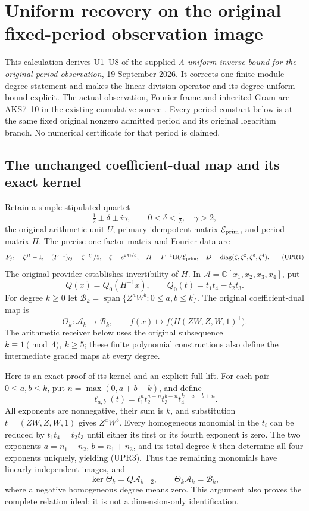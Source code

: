 \begingroup
\section{Uniform recovery on the original fixed-period observation image}
\label{sec:UPR}

This calculation derives U1--U8 of the supplied
\emph{A uniform inverse bound for the original period observation},
19 September 2026.  It corrects one finite-module degree statement and
makes the linear division operator and its degree-uniform bound explicit.
The actual observation, Fourier frame and inherited Gram are AKS7--10
in the existing cumulative source \cite{programme:aks-current}.
Every period constant below is at the same fixed original nonzero
admitted period and its original logarithm branch.  No numerical
certificate for that period is claimed.

\subsection{The unchanged coefficient-dual map and its exact kernel}
Retain a simple stipulated quartet
\[
\tfrac12\pm\delta\pm i\gamma,\qquad
0<\delta<\tfrac12,\quad\gamma>2,
\]
the original arithmetic unit \(U\), primary idempotent matrix
\(\mathcal E_{\rm prim}\), and period matrix \(\Pi\).  The precise
one-factor matrix and Fourier data are
\[
F_{jt}=\zeta^{jt}-1,\quad
(F^{-1})_{tj}=\zeta^{-tj}/5,\quad
\zeta=e^{2\pi i/5},\quad
H=F^{-1}\Pi U\mathcal E_{\rm prim},\quad
D=\operatorname{diag}(\zeta,\zeta^2,\zeta^3,\zeta^4).
\tag{UPR1}
\]
The original provider establishes invertibility of \(H\).  In
\(\mathcal A=\mathbb C[x_1,x_2,x_3,x_4]\), put
\[
Q(x)=Q_0(H^{-1}x),\qquad Q_0(t)=t_1t_4-t_2t_3.
\]
For degree \(k\ge0\) let
\(\mathcal B_k=\operatorname{span}\{Z^aW^b:0\le a,b\le k\}\).
The original coefficient-dual map is
\[
\Theta_k:\mathcal A_k\longrightarrow\mathcal B_k,\qquad
f(x)\longmapsto f\bigl(H(ZW,Z,W,1)^{\mathsf T}\bigr).
\tag{UPR2}
\]
The arithmetic receiver below uses the original subsequence
\(k\equiv1\pmod4,\ k\ge5\); these finite polynomial constructions
also define the intermediate graded maps at every degree.

Here is an exact proof of its kernel and an explicit full lift.
For each pair \(0\le a,b\le k\), put \(n=\max(0,a+b-k)\), and define
\[
\ell_{a,b}(t)=
t_1^nt_2^{a-n}t_3^{b-n}t_4^{k-a-b+n}.
\tag{UPR3}
\]
All exponents are nonnegative, their sum is \(k\), and substitution
\(t=(ZW,Z,W,1)\) gives \(Z^aW^b\).  Every homogeneous monomial in
the \(t_i\) can be reduced by \(t_1t_4=t_2t_3\) until either its
first or its fourth exponent is zero.  The two exponents
\(a=n_1+n_2\), \(b=n_1+n_3\), and its total degree \(k\) then
determine all four exponents uniquely, yielding (UPR3).
Thus the remaining monomials have linearly independent images, and
\[
\ker\Theta_k=Q\mathcal A_{k-2},\qquad
\Theta_k\mathcal A_k=\mathcal B_k,
\tag{UPR4}
\]
where a negative homogeneous degree means zero.  This argument
also proves the complete relation ideal; it is not a dimension-only
identification.

